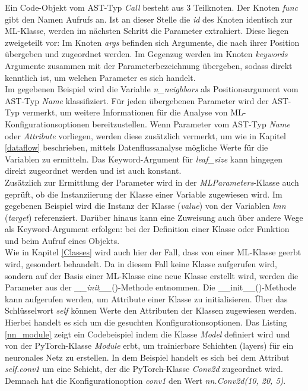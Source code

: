 \documentclass[german,bachelor]{swsLeipzig}
\begin{document}
Ein Code-Objekt vom AST-Typ \textit{Call} besteht aus 3 Teilknoten.
Der Knoten \textit{func} gibt den Namen Aufrufs an.
Ist an dieser Stelle die \textit{id} des Knoten identisch zur ML-Klasse, werden im nächsten Schritt die Parameter
extrahiert.
Diese liegen zweigeteilt vor:
Im Knoten \textit{args} befinden sich Argumente, die nach ihrer Position übergeben und zugeordnet werden.
Im Gegenzug werden im Knoten \textit{keywords} Argumente zusammen mit der Parameterbezeichnung übergeben, sodass direkt kenntlich
ist, um welchen Parameter es sich handelt. \\
\indent Im gegebenen Beispiel wird die Variable \textit{n\_neighbors} als Positionsargument vom AST-Typ \textit{Name} klassifiziert.
Für jeden übergebenen Parameter wird der AST-Typ vermerkt, um weitere Informationen für die Analyse von ML-Konfigurationsoptionen
bereitzustellen.
Wenn Parameter vom AST-Typ \textit{Name} oder \textit{Attribute} vorliegen, werden diese zusätzlich vermerkt, um wie
in Kapitel \ref{dataflow} beschrieben, mittels Datenflussanalyse mögliche Werte für die Variablen zu ermitteln.
Das Keyword-Argument für \textit{leaf\_size} kann hingegen direkt zugeordnet werden und ist auch konstant. \\
\indent Zusätzlich zur Ermittlung der Parameter wird in der \textit{MLParameters}-Klasse auch geprüft, ob die Instanziierung der Klasse
einer Variable zugewiesen wird.
Im gegebenen Beispiel wird die Instanz der Klasse (\textit{value}) von der Variablen \textit{knn} (\textit{target}) referenziert.
Darüber hinaus kann eine Zuweisung auch über andere Wege als Keyword-Argument erfolgen:
bei der Definition einer Klasse oder Funktion und beim Aufruf eines Objekts.\\
\indent Wie in Kapitel \ref{Classes} wird auch hier der Fall, dass von einer ML-Klasse geerbt wird, gesondert behandelt.
Da in diesem Fall keine Klasse aufgerufen wird, sondern auf der Basis einer ML-Klasse eine neue Klasse erstellt wird, werden die Parameter aus der
\textit{\_\_init\_\_}()-Methode entnommen.
Die \_\_init\_\_()-Methode kann aufgerufen werden, um Attribute einer Klasse zu initialisieren.
Über das Schlüsselwort \textit{self} können Werte den Attributen der Klassen zugewiesen werden.
Hierbei handelt es sich um die gesuchten Konfigurationsoptionen.
Das Listing \ref{nn_module} zeigt ein Codebeispiel indem die Klasse \textit{Model} definiert wird und
von der PyTorch-Klasse \textit{Module} erbt, um trainierbare Schichten (layers) für ein neuronales Netz zu erstellen.
In dem Beispiel handelt es sich bei dem Attribut \textit{self.conv1} um eine Schicht, der die PyTorch-Klasse \textit{Conv2d}
zugeordnet wird.
Demnach hat die Konfigurationoption \textit{conv1} den Wert \textit{nn.Conv2d(10, 20, 5)}.\\
\end{document}

